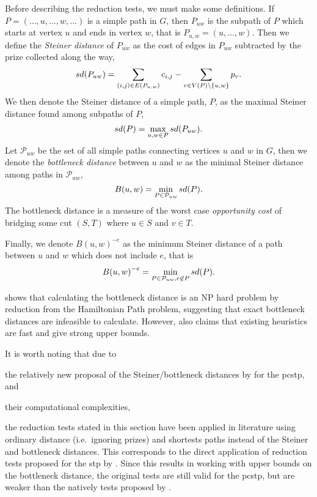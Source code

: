 Before describing the reduction tests, we must make some definitions.
If $P = (\ldots, u, \ldots, w, \ldots)$ is a simple path in $G$, then $P_{uw}$ is
the subpath of $P$ which starts at vertex $u$ and ends in vertex $w$,
that is $P_{u,w} = (u, \ldots,w)$. Then we define the \textit{Steiner distance} of
$P_{uw}$ as the cost of edges in $P_{uw}$ subtracted by the prize collected along
 the way,
 $$sd(P_{uw}) = \sum_{(i,j) \in E(P_{u,w})} c_{i,j} -
 \sum_{v \in V(P) \setminus \{u,w\}} p_{v}\mathnormal{.}$$
 We then denote the Steiner distance of a simple path, $P$, as the maximal Steiner
 distance found among subpaths of $P$,
 $$sd(P) = \max_{u,w \in P} sd(P_{uw})\mathnormal{.}$$
 Let $\mathcal{P}_{uw}$ be the set of all simple paths
 connecting vertices $u$ and $w$ in
 $G$, then we denote the \textit{bottleneck distance} between $u$ and $w$ as the minimal Steiner
  distance among paths in $\mathcal{P}_{uw}$,
  $$B(u,w) = \min_{P \in  \mathcal{P}_{uw}} sd(P)\mathnormal{.}$$
  The bottleneck distance is a measure of the worst case \textit{opportunity cost}
 of bridging some cut $(S, T)$
 where $u \in S$ and $v \in T$.

 Finally, we denote ${B(u,w)}^{-e}$
 as the minimum Steiner distance of a path between $u$ and $w$ which does
   not include $e$, that is
  $${B(u,w)}^{-e} = \min_{P \in  \mathcal{P}_{uw}, e \not \in P} sd(P)\mathnormal{.}$$

 \citet{uchoa2006reduction} shows that calculating the bottleneck distance
 is an NP hard problem by reduction from the Hamiltonian Path problem, suggesting that
 exact bottleneck distances are infeasible to calculate. However, \citet{uchoa2006reduction}
 also claims that existing heuristics are fast and give strong upper bounds.

It is worth noting that due to
\begin{enumerate*}[label={\alph*)}]
\item the relatively new proposal of the Steiner/bottleneck distances by \citet{uchoa2006reduction} for the \gls{pcstp}, and
\item their computational complexities,
\end{enumerate*}
the reduction tests stated in this section have been applied in literature
using ordinary distance (i.e.\ ignoring prizes) and shortests paths
instead of the Steiner and bottleneck distances. This corresponds to the direct application of
reduction tests
proposed for the \gls{stp} by \citet{duin1989edge,duin1989reduction}. Since this results in
working with
upper bounds on the bottleneck distance, the original
tests are still valid for the \gls{pcstp},
but are weaker than the natively tests proposed by \citet{uchoa2006reduction}.

